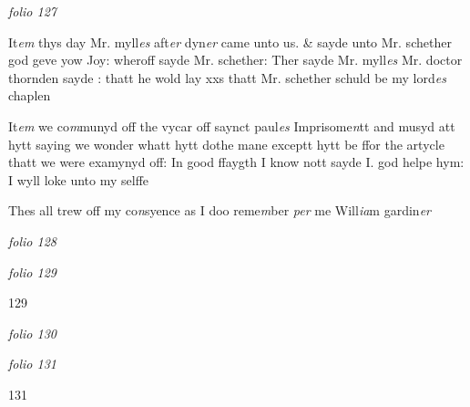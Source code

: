 \documentclass[12pt, a4paper]{book}
\begin{document}
\dotfill
						\newpage
{}

\textit{folio 127}


 	
		\ifthenelse{\isodd{\thepage}}
		{\reversemarginpar}
		{\normalmarginpar}
		It\textit{em} thys day Mr. myll\textit{es} aft\textit{er} dyn\textit{er} came unto us. \& sayde unto Mr. schether
 		god geve yow Joy: wheroff sayde Mr. schether: Ther sayde Mr. myll\textit{es}
 		Mr. doctor thornden sayde : thatt he wold lay xxs thatt Mr. schether
 schuld be my lord\textit{es} chaplen

		\ifthenelse{\isodd{\thepage}}
		{\reversemarginpar}
		{\normalmarginpar}
		It\textit{em} we co\textit{m}munyd off the vycar off saynct paul\textit{es} Imprisome\textit{n}tt and musyd
 att hytt saying we wonder whatt hytt dothe mane exceptt hytt be
 ffor the artycle thatt we were examynyd off: In good ffaygth I know
 nott sayde I. god helpe hym: I wyll loke unto my selffe
 
		\ifthenelse{\isodd{\thepage}}
		{\reversemarginpar}
		{\normalmarginpar}
		Thes all trew off my co\textit{n}syence as I doo reme\textit{m}ber
 \textit{per} me Will\textit{ia}m gardin\textit{er}
               
\dotfill
						\newpage
{}

\textit{folio 128}


         \vspace*{4cm}
         
\dotfill
						

\textit{folio 129}


\begin{flushright}{\color{Mahogany}129}\end{flushright}

\dotfill
						\newpage
{}

\textit{folio 130}


         \vspace*{4cm}
         
\dotfill
						

\textit{folio 131}


\begin{flushright}{\color{Mahogany}131}\end{flushright}

\dotfill
						\newpage
{}
\end{document}

